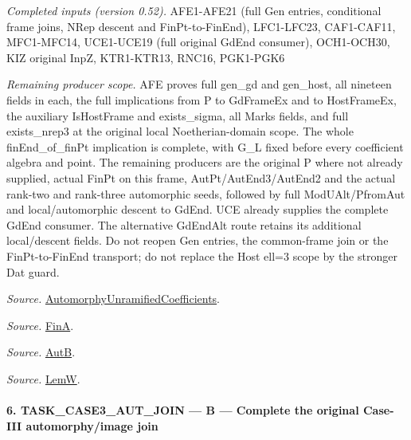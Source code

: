 \emph{Completed inputs (version 0.52).} AFE1-AFE21 (full Gen entries, conditional frame joins, NRep descent and FinPt-to-FinEnd), LFC1-LFC23, CAF1-CAF11, MFC1-MFC14, UCE1-UCE19 (full original GdEnd consumer), OCH1-OCH30, KIZ original InpZ, KTR1-KTR13, RNC16, PGK1-PGK6

\emph{Remaining producer scope.} AFE proves full gen\_\allowbreak gd and gen\_\allowbreak host, all nineteen fields in each, the full implications from P to GdFrameEx and to HostFrameEx, the auxiliary IsHostFrame and exists\_\allowbreak sigma, all Marks fields, and full exists\_\allowbreak nrep3 at the original local Noetherian-domain scope. The whole finEnd\_\allowbreak of\_\allowbreak finPt implication is complete, with G\_\allowbreak L fixed before every coefficient algebra and point. The remaining producers are the original P where not already supplied, actual FinPt on this frame, AutPt/AutEnd3/AutEnd2 and the actual rank-two and rank-three automorphic seeds, followed by full ModUAlt/PfromAut and local/automorphic descent to GdEnd. UCE already supplies the complete GdEnd consumer. The alternative GdEndAlt route retains its additional local/descent fields. Do not reopen Gen entries, the common-frame join or the FinPt-to-FinEnd transport; do not replace the Host ell=3 scope by the stronger Dat guard.

\emph{Source.} \href{https://github.com/CocoSgt/riemann-hypothesis-lean/blob/7cbf7a0c32fca1badf05931879a37c3f8a2b03b4/src/Development/AutomorphicArithmetic/AutomorphicVarieties/AutomorphicCases/AutomorphyUnramifiedCoefficients.lean#L24-L27}{AutomorphyUnramifiedCoefficients}.

\emph{Source.} \href{https://github.com/CocoSgt/riemann-hypothesis-lean/blob/7cbf7a0c32fca1badf05931879a37c3f8a2b03b4/src/Development/AutomorphicArithmetic/AutomorphicVarieties/AutomorphicCases/AutomorphyUnramifiedCoefficients.lean#L12-L13}{FinA}.

\emph{Source.} \href{https://github.com/CocoSgt/riemann-hypothesis-lean/blob/7cbf7a0c32fca1badf05931879a37c3f8a2b03b4/src/Development/AutomorphicArithmetic/AutomorphicVarieties/AutomorphicCases/AutomorphyUnramifiedCoefficients.lean#L15-L17}{AutB}.

\emph{Source.} \href{https://github.com/CocoSgt/riemann-hypothesis-lean/blob/7cbf7a0c32fca1badf05931879a37c3f8a2b03b4/src/Development/AutomorphicArithmetic/AutomorphicVarieties/AutomorphicCases/AutomorphyUnramifiedCoefficients.lean#L19-L22}{LemW}.



\paragraph{6. TASK\_\allowbreak CASE3\_\allowbreak AUT\_\allowbreak JOIN — B — Complete the original Case-III automorphy/image join}

